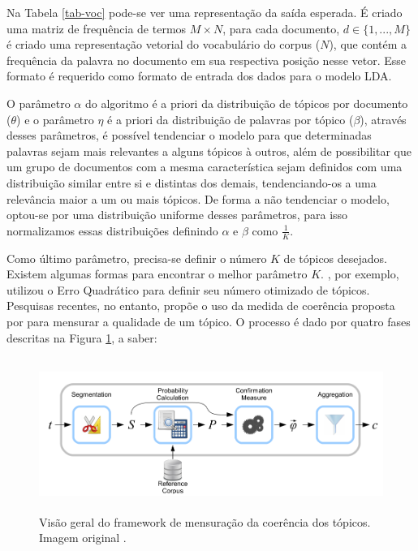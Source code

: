 \documentclass[12pt,a4paper]{article}
\begin{document}
Na Tabela \ref{tab-voc} pode-se ver uma representação da saída esperada. É criado uma matriz de frequência de termos $M \times N$, para cada documento,
 $d \in \{1,. . . , M\}$ é criado uma representação vetorial do vocabulário do corpus ($N$), que contém a frequência da palavra no documento em sua respectiva posição nesse vetor.
 Esse formato é requerido como formato de entrada dos dados para o modelo LDA.

O parâmetro $\alpha$ do algoritmo é a priori da distribuição de tópicos por documento ($\theta$) e o parâmetro $\eta$ é a priori da distribuição de palavras por tópico ($\beta$),
 através desses parâmetros, é possível tendenciar o modelo para que determinadas palavras sejam mais relevantes a alguns tópicos à outros,
 além de possibilitar que um grupo de documentos com a mesma característica sejam definidos com uma distribuição similar entre si e distintas dos demais,
 tendenciando-os a uma relevância maior a um ou mais tópicos. De forma a não tendenciar o modelo, optou-se por uma distribuição uniforme desses parâmetros,
 para isso normalizamos essas distribuições definindo $\alpha$ e $\beta$ como $\frac{1}{K}$.

Como último parâmetro, precisa-se definir o número $K$ de tópicos desejados. Existem algumas formas para encontrar o melhor parâmetro $K$.  , por exemplo, utilizou o Erro Quadrático para definir seu número otimizado de tópicos. Pesquisas recentes, no entanto,
 propõe o uso da medida de coerência proposta por  para mensurar a qualidade de um tópico. O processo é dado por quatro fases descritas na Figura \ref{fig-proc}, a saber:


\begin{figure}[H]
	\centering
    \includegraphics[height=5cm]{images/figure_3.png}
    \caption{Visão geral do framework de mensuração da coerência dos tópicos. Imagem original .}
    \label{fig-proc}

\end{figure}
\end{document}

